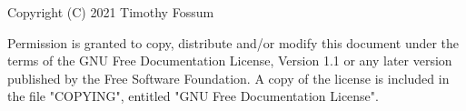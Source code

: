 \begin{minipage}[t]{\sw}
\LARGE
\vspace*{1in}
Copyright (C) 2021 Timothy Fossum\exx

Permission is granted to copy, distribute and/or modify this document
under the terms of the GNU Free Documentation License, Version 1.1
or any later version published by the Free Software Foundation.
A copy of the license is included in the file "COPYING", entitled "GNU
Free Documentation License".

\end{minipage}
\clearpage
